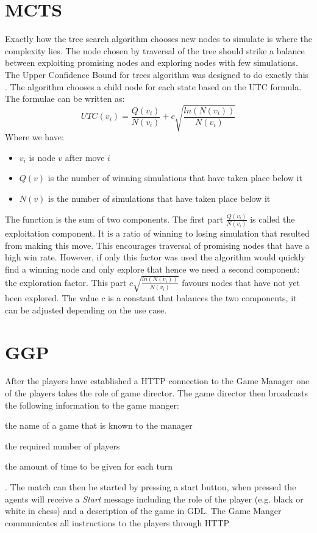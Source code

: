 \section{MCTS}
Exactly how the tree search algorithm chooses new nodes to simulate is where the complexity lies. The node chosen by traversal of the tree should strike a balance between exploiting promising nodes and exploring nodes with few simulations. The Upper Confidence Bound for trees algorithm was designed to do exactly this \cite{Kocsis/UCT}. The algorithm chooses a child node for each state based on the UTC formula. The formulae can be written as: \[UTC(v_i) = \frac{Q(v_i)}{N(v_i)} + c\sqrt{\frac{ln(N(v_i))}{N(v_i)}}\] Where we have:
\begin{itemize}
	\item $v_i$ is node $v$ after move $i$
	\item $Q(v)$ is the number of winning simulations that have taken place below it
	\item $N(v)$ is the number of simulations that have taken place below it
\end{itemize}
The function is the sum of two components. The first part $\frac{Q(v_i)}{N(v_i)}$ is called the exploitation component. It is a ratio of winning to losing simulation that resulted from making this move. This encourages traversal of promising nodes that have a high win rate. However, if only this factor was used the algorithm would quickly find a winning node and only explore that hence we need a second component: the exploration factor. This part $c\sqrt{\frac{ln(N(v_i))}{N(v_i)}}$ favours nodes that have not yet been explored. The value $c$ is a constant that balances the two components, it can be adjusted depending on the use case.



\section{GGP}
 After the players have established a HTTP connection to the Game Manager one of the players takes the role of game director. The game director then broadcasts the following information to the game manger: \begin{enumerate*}[label={\arabic*)}]
	\item the name of a game that is known to the manager
	\item the required number of players
	\item the amount of time to be given for each turn
\end{enumerate*}. The match can then be started by pressing a start button, when pressed the agents will receive a \textit{Start} message including the role of the player (e.g. black or white in chess) and a description of the game in GDL. The Game Manger communicates all instructions to the players through HTTP


